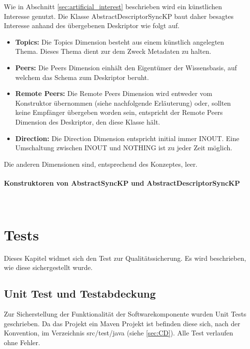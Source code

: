 \documentclass[a4paper]{article}
\begin{document}
	Wie in Abschnitt \ref{sec:artificial_interest} beschrieben wird ein künstlichen
	Interesse genutzt. Die Klasse AbstractDescriptorSyncKP baut daher besagtes
	Interesse anhand des übergebenen Deskriptor wie folgt auf. 
	
	\begin{itemize}
		\item \textbf{Topics:} Die Topics Dimension besteht aus einem künstlich
		angelegten Thema. Dieses Thema dient zur dem Zweck Metadaten zu halten.
		\item \textbf{Peers:} Die Peers Dimension einhält den Eigentümer der
		Wissensbasis, auf welchem das Schema zum Deskriptor beruht.
		\item \textbf{Remote Peers:} Die Remote Peers Dimension wird entweder
		vom Konstruktor übernommen (siehe nachfolgende Erläuterung) oder, sollten
		keine Empfänger übergeben worden sein, entspricht der Remote Peers Dimension
		des Deskriptor, den diese Klasse hält.
		\item \textbf{Direction:} Die Direction Dimension entspricht initial
		immer INOUT. Eine Umschaltung zwischen INOUT und NOTHING ist zu jeder Zeit
		möglich.
	\end{itemize}
	
	Die anderen Dimensionen sind, entsprechend des Konzeptes, leer.
	
	\paragraph{Konstruktoren von AbstractSyncKP und AbstractDescriptorSyncKP}
	\mbox{} \\
	

	
	\newpage
	\section{Tests}
	
	Dieses Kapitel widmet sich den Test zur Qualitätssicherung. Es wird beschrieben,
	wie diese sichergestellt wurde.
	
	\subsection{Unit Test und Testabdeckung}
	
	Zur Sicherstellung der Funktionalität der Softwarekomponente wurden Unit Tests
	geschrieben. Da das Projekt ein Maven Projekt ist befinden diese sich, nach
	der Konvention, im Verzeichnis src/test/java (siehe \autoref{sec:CD}). Alle
	Test verlaufen ohne Fehler. \\
	
\end{document}
